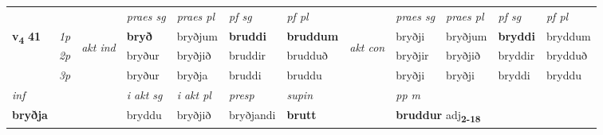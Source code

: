 \begin{longtable}[l]{X>{\footnotesize\itshape}llXXXXlXXXX}
\midrule

 & &   & \textit{praes sg}  & \textit{praes pl}    & \textit{ pf sg} & \textit{pf pl} & & \textit{praes sg}  & \textit{praes pl}    & \textit{pf sg} & \textit{pf pl }  \\ \cmidrule{4-7} \cmidrule{9-12}
 \multirow{2}{*}{{{\textbf{v{\textsubscript{4}}} \Large{\textbf{41}}}}}  & 1p & \multirow{3}{*}{\begin{turn}{90}\textit{akt ind}\end{turn}} & \textbf{bryð} & bryðjum & \textbf{bruddi} & \textbf{bruddum} & \multirow{3}{*}{\begin{turn}{90}\textit{akt con}\end{turn}} &bryðji & bryðjum & \textbf{bryddi} & bryddum\\*
 & 2p &  &  bryður  & bryðjið & bruddir & brudduð & & bryðjir & bryðjið & bryddir & brydduð \\*
 & 3p &  & bryður & bryðja & bruddi & bruddu & & bryðji & bryðji& bryddi & bryddu \\*
\cmidrule{4-7} \cmidrule{9-12}

   {\textit{inf}} & &  & \textit{i akt sg} & \textit{i akt pl}   & \textit{presp} & \textit{supin}  && \textit{pp m} \\*
  {\textbf{bryðja}} & && bryddu  & bryðjið   & bryðjandi &  \textbf{brutt}  && \multicolumn{2}{l}{\textbf{bruddur} adj\textbf{\textsubscript{2-18}}} \\*

\midrule


\end{longtable}
